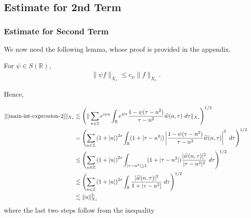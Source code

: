 \documentclass[handout]{beamer}
\numberwithin{equation}{section}
\newcommand{\rr}{\mathbb{R}}
\newcommand{\zz}{\mathbb{Z}}
\newcommand{\wh}{\widehat}
\begin{document}
\subsection{Estimate for 2nd Term}

\begin{frame}
	\frametitle{Estimate for Second Term}
We now need the following lemma, whose proof is provided in the appendix.
%
%
%
%
%
%
%
%
\begin{lemma}
	\label{lem:schwartz-mult}
	For $\psi \in S(\rr)$,
%
%
\begin{equation}
	\label{schwartz-mult}
	\begin{split}
		\|\psi f \|_{X_s} \le c_{\psi} \|f \|_{X_s}.
	\end{split}
\end{equation}
%
%
\end{lemma}
%
%
Hence,

\end{frame}
%
%
%
\begin{frame}

\begin{equation}
	\label{main-int2-est}
	\begin{split}
		\|\eqref{main-int-expression-2}\|_{X_s} 
		& \lesssim 
		\left( \| \sum_{n \in \zz} e^{ixn} \int_\rr 
		e^{it \tau} \frac{ 1 - \psi(\tau - n^{2}) 
		}{\tau - n^{2}} \wh{w}(n, \tau) \ 
		d\tau\|_{X_s} \right)^{1/2}
		\\
		& =  \left( \sum_{n \in \zz} \left(1 + |n| \right)^{2s} \int_\rr
		(1 + |\tau - n^{2}|) \left | \frac{1 - \psi(\tau - n^{2 
		})}{\tau - n^{2}} 
		\wh{w}(n, \tau) \right |^2 \ d 
		\tau \right)^{1/2}
		\\
		& \le \left( \sum_{n \in \zz} \left(1 + |n| \right)^{2s} \int_{| \tau - n^{2 }| \ge 1}
		(1 + |\tau - n^{2}|) \frac{|\wh{w}(n, \tau)|^2 }{|\tau - n^{2 }|^2} 
		\ d 
		\tau \right)^{1/2}
		\\
		& \lesssim  \left( \sum_{n \in 
		\zz} \left(1 + |n| \right)^{2s} \int_\rr
		\frac{|\wh{w}(n, \tau) |^2}{1+ |\tau - 
		n^{2}|} 
		 \ d \tau 
		\right)^{1/2}
		\\
		& \lesssim  \|u\|_{X_s}^3
	\end{split}
\end{equation}
%
%
where the last two steps follow from the inequality 

\end{frame}
\end{document}
